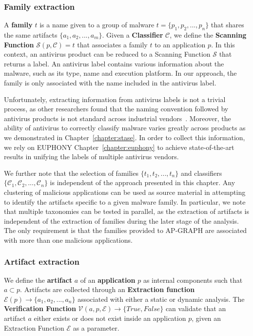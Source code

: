 \subsubsection{Family extraction}
A \textbf{family} $\mathit{t}$ is a name given to a group of malware $\mathit{t} = \{\mathit{p}_1, \mathit{p}_2, ..., \mathit{p}_n\}$ that shares the same artifacts $\{\mathit{a}_1, \mathit{a}_2, ..., \mathit{a}_m\}$.
Given a \textbf{Classifier} $\mathcal{C}$, we define the \textbf{Scanning Function} $\mathcal{S}(\mathit{p}, \mathcal{C}) = \mathit{t}$ that associates a family $\mathit{t}$ to an application $\mathit{p}$.
In this context, an antivirus product can be reduced to a Scanning Function $\mathcal{S}$ that returns a label.
An antivirus label contains various information about the malware, such as its type, name and execution platform.
In our approach, the family is only associated with the name included in the antivirus label.

Unfortunately, extracting information from antivirus labels is not a trivial process, as other researchers found that the naming convention followed by antivirus products is not standard across industrial vendors~\cite{bontchev_current_2005,harley_game_2009}.
Moreover, the ability of antivirus to correctly classify malware varies greatly across products as we demonstrated in Chapter~\ref{chapter:stase}.
In order to collect this information, we rely on EUPHONY Chapter~\ref{chapter:euphony} to achieve state-of-the-art results in unifying the labels of multiple antivirus vendors.

We further note that the selection of families $\{\mathit{t}_1, \mathit{t}_2, ..., \mathit{t}_n\}$ and classifiers $\{\mathcal{C}_1, \mathcal{C}_2, ..., \mathcal{C}_n\}$ is independent of the approach presented in this chapter.
Any clustering of malicious applications can be used as source material in attempting to identify the artifacts specific to a given malware family.
In particular, we note that multiple taxonomies can be tested in parallel, as the extraction of artifacts is independent of the extraction of families during the later stage of the analysis.
The only requirement is that the families provided to AP-GRAPH are associated with more than one malicious applications.
\subsubsection{Artifact extraction}
We define the \textbf{artifact} $\mathit{a}$ of an \textbf{application} $\mathit{p}$ as internal components such that $\mathit{a} \subset \mathit{p}$.
Artifacts are collected through an \textbf{Extraction function} $\mathcal{E}(\mathit{p}) \rightarrow \{\mathit{a}_1, \mathit{a}_2, ..., \mathit{a}_n\}$ associated with either a static or dynamic analysis.
The \textbf{Verification Function} $\mathcal{V}(\mathit{a}, \mathit{p}, \mathcal{E}) \rightarrow \{True, False\}$ can validate that an artifact $\mathit{a}$ either exists or does not exist inside an application $\mathit{p}$, given an Extraction Function $\mathcal{E}$ as a parameter.

